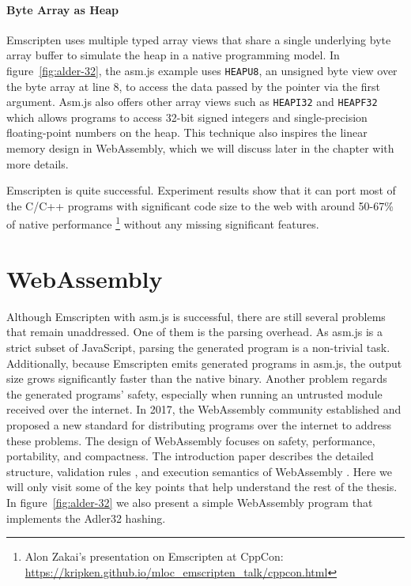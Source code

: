 \paragraph{Byte Array as Heap}
Emscripten uses multiple typed array views that share a single underlying byte array buffer to simulate the heap in a native programming model. In figure~\ref{fig:alder-32}, the asm.js example uses \texttt{HEAPU8}, an unsigned byte view over the byte array at line $8$, to access the data passed by the pointer via the first argument. Asm.js also offers other array views such as \texttt{HEAPI32} and \texttt{HEAPF32} which allows programs to access 32-bit signed integers and single-precision floating-point numbers on the heap. This technique also inspires the linear memory design in WebAssembly, which we will discuss later in the chapter with more details.

Emscripten is quite successful. Experiment results show that it can port most of the C/C++ programs with significant code size to the web with around 50-67\% of native performance \footnote{Alon Zakai's presentation on Emscripten at CppCon: \\\url{https://kripken.github.io/mloc_emscripten_talk/cppcon.html}} without any missing significant features.

\section{WebAssembly}

Although Emscripten with asm.js is successful, there are still several problems that remain unaddressed. One of them is the parsing overhead. As asm.js is a strict subset of JavaScript, parsing the generated program is a non-trivial task. Additionally, because Emscripten emits generated programs in asm.js, the output size grows significantly faster than the native binary. Another problem regards the generated programs' safety, especially when running an untrusted module received over the internet. In 2017, the WebAssembly community established and proposed a new standard for distributing programs over the internet to address these problems. The design of WebAssembly focuses on safety, performance, portability, and compactness. The introduction paper describes the detailed structure, validation rules \cite{10.1145/3167082}, and execution semantics of WebAssembly \cite{10.1145/3062341.3062363}. Here we will only visit some of the key points that help understand the rest of the thesis. In figure~\ref{fig:alder-32} we also present a simple WebAssembly program that implements the Adler32 hashing.

